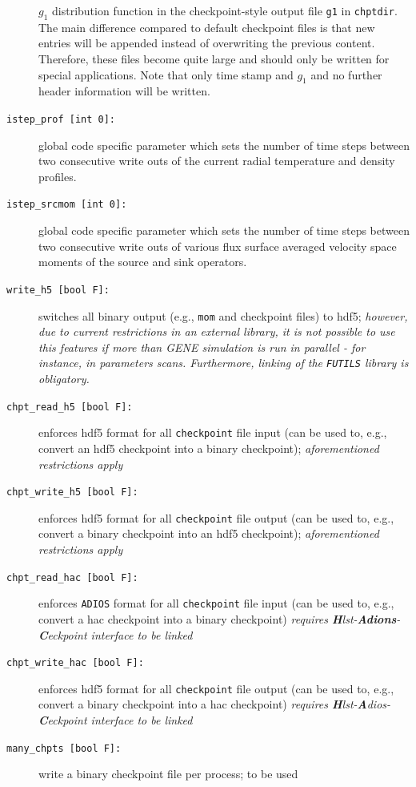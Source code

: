 \documentclass[12pt]{article}
\begin{document}
\begin{description}
$g_1$ distribution function in the checkpoint-style output file {\tt g1} in {\tt chptdir}.
The main difference compared to default checkpoint files is that new entries will be appended instead
of overwriting the previous content. Therefore, these files become quite large and should only be
written for special applications. Note that only time stamp and $g_1$ and no further header information will be written.
\item[\hypertarget{istep_prof}{\tt istep\_prof [int 0]:}] global code specific parameter which sets the number of
time steps between two consecutive write outs of the current radial temperature and density profiles.
\item[\hypertarget{istep_srcmom}{\tt istep\_srcmom [int 0]:}] global code specific parameter which sets the number of
time steps between two consecutive write outs of various flux surface averaged velocity space moments
of the source and sink operators.
\item[\texttt{write\_h5 [bool F]:}] switches all binary output (e.g., {\tt mom} and checkpoint files)
to hdf5; {\em however, due to current restrictions in an external library, it is not possible to use this features
if more than GENE simulation is run in parallel - for instance, in parameters scans. Furthermore,
linking of the {\tt FUTILS} library is obligatory.}
\item[\texttt{chpt\_read\_h5 [bool F]:}] enforces hdf5 format for all {\tt checkpoint} file input
(can be used to, e.g., convert an hdf5 checkpoint into a binary checkpoint);
{\em aforementioned restrictions apply}
\item[\texttt{chpt\_write\_h5 [bool F]:}] enforces hdf5 format for all {\tt checkpoint} file output
(can be used to, e.g., convert a binary checkpoint into an hdf5 checkpoint);
{\em aforementioned restrictions apply}
\item[\texttt{chpt\_read\_hac [bool F]:}] enforces {\tt ADIOS} format for all {\tt checkpoint} file input
(can be used to, e.g., convert a hac checkpoint into a binary checkpoint)
{\em requires {\bf H}lst-{\bf Adions}-{\bf C}eckpoint interface to be linked}
\item[\texttt{chpt\_write\_hac [bool F]:}] enforces hdf5 format for all {\tt checkpoint} file output
(can be used to, e.g., convert a binary checkpoint into a hac checkpoint)
{\em requires {\bf H}lst-{\bf A}dios-{\bf C}eckpoint interface to be linked}
\item[\texttt{many\_chpts [bool F]:}] write a binary checkpoint file per process; to be used

\end{description}
\end{document}
